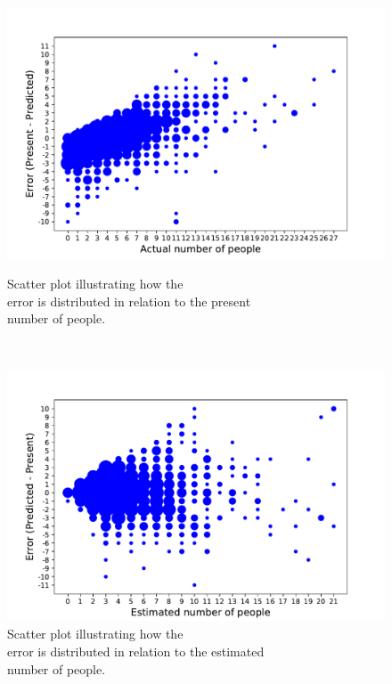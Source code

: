 \begin{figure}[H]
\begin{minipage}[b]{8.5cm}
\centering
\includegraphics[width=1\textwidth]{images/scatterplotpres}
\caption{Scatter plot illustrating how the\\error is distributed in relation to the present\\number of people.}
\label{fig:scatterplotpres}
\end{minipage}
\ \hspace{2mm} \
\begin{minipage}[b]{8.5cm}
\centering
\includegraphics[width=1\textwidth]{images/scatterplotest}
\caption{Scatter plot illustrating how the\\error is distributed in relation to the estimated\\number of people.}
\label{fig:scatterplotest}
\end{minipage}
\end{figure}

